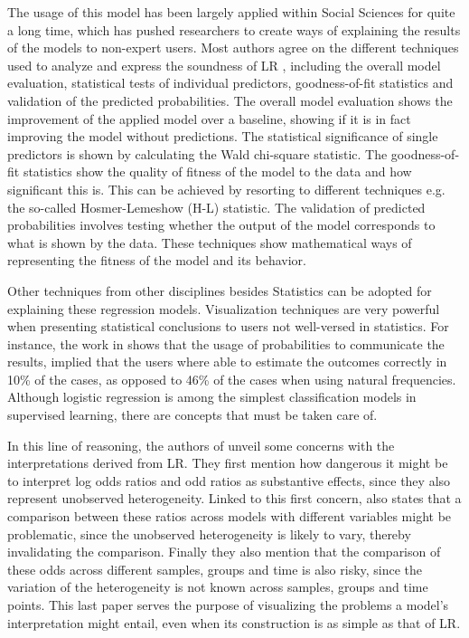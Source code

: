 \documentclass[final]{elsarticle}
\begin{document}
The usage of this model has been largely applied within Social Sciences for quite a long time, which has pushed researchers to create ways of explaining the results of the models to non-expert users. Most authors agree on the different techniques used to analyze and express the soundness of LR \cite{PurposeLR,InteractionLR,AppliedLR,IntroLR}, including the overall model evaluation, statistical tests of individual predictors, goodness-of-fit statistics and validation of the predicted probabilities. The overall model evaluation shows the improvement of the applied model over a baseline, showing if it is in fact improving the model without predictions. The statistical significance of single predictors is shown by calculating the Wald chi-square statistic. The goodness-of-fit statistics show the quality of fitness of the model to the data and how significant this is. This can be achieved by resorting to different techniques e.g. the so-called Hosmer-Lemeshow (H-L) statistic. The validation of predicted probabilities involves testing whether the output of the model corresponds to what is shown by the data. These techniques show mathematical ways of representing the fitness of the model and its behavior. 

Other techniques from other disciplines besides Statistics can be adopted for explaining these regression models. Visualization techniques are very powerful when presenting statistical conclusions to users not well-versed in statistics. For instance, the work in \cite{NaturalFrecuencies} shows that the usage of probabilities to communicate the results, implied that the users where able to estimate the outcomes correctly in 10\% of the cases, as opposed to 46\% of the cases when using natural frequencies. Although logistic regression is among the simplest classification models in supervised learning, there are concepts that must be taken care of.

In this line of reasoning, the authors of \cite{CannotDo} unveil some concerns with the interpretations derived from LR. They first mention how dangerous it might be to interpret log odds ratios and odd ratios as substantive effects, since they also represent unobserved heterogeneity. Linked to this first concern, \cite{CannotDo} also states that a comparison between these ratios across models with different variables might be problematic, since the unobserved heterogeneity is likely to vary, thereby invalidating the comparison. Finally they also mention that the comparison of these odds across different samples, groups and time is also risky, since the variation of the heterogeneity is not known across samples, groups and time points. This last paper serves the purpose of visualizing the problems a model's interpretation might entail, even when its construction is as simple as that of LR.
\end{document}
